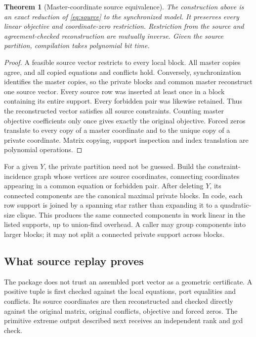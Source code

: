 \documentclass[11pt,a4paper]{article}
\newtheorem{theorem}{Theorem}[section]
\theoremstyle{definition}
\theoremstyle{remark}
\begin{document}
\begin{theorem}[Master-coordinate source equivalence]
\label{thm:master-source}
The construction above is an exact reduction of \eqref{eq:source} to the synchronized model. It preserves every linear objective and coordinate-zero restriction. Restriction from the source and agreement-checked reconstruction are mutually inverse. Given the source partition, compilation takes polynomial bit time.
\end{theorem}
\begin{proof}
A feasible source vector restricts to every local block. All master copies agree, and all copied equations and conflicts hold. Conversely, synchronization identifies the master copies, so the private blocks and common master reconstruct one source vector. Every source row was inserted at least once in a block containing its entire support. Every forbidden pair was likewise retained. Thus the reconstructed vector satisfies all source constraints. Counting master objective coefficients only once gives exactly the original objective. Forced zeros translate to every copy of a master coordinate and to the unique copy of a private coordinate. Matrix copying, support inspection and index translation are polynomial operations.
\end{proof}

For a given $Y$, the private partition need not be guessed. Build the constraint-incidence graph whose vertices are source coordinates, connecting coordinates appearing in a common equation or forbidden pair. After deleting $Y$, its connected components are the canonical maximal private blocks. In code, each row support is joined by a spanning star rather than expanding it to a quadratic-size clique. This produces the same connected components in work linear in the listed supports, up to union-find overhead. A caller may group components into larger blocks; it may not split a connected private support across blocks.

\subsection{What source replay proves}
The package does not trust an assembled port vector as a geometric certificate. A positive tuple is first checked against the local equations, port equalities and conflicts. Its source coordinates are then reconstructed and checked directly against the original matrix, original conflicts, objective and forced zeros. The primitive extreme output described next receives an independent rank and gcd check.
\end{document}
